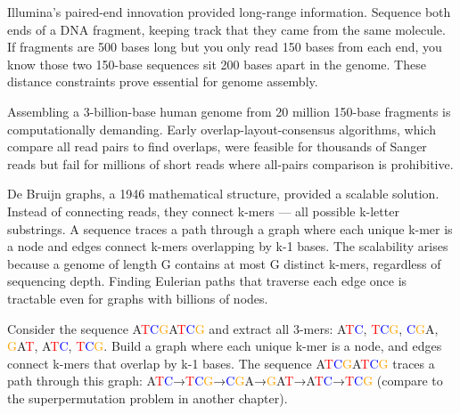 Illumina's paired-end innovation provided long-range information. Sequence both ends of a DNA fragment, keeping track that they came from the same molecule. If fragments are 500 bases long but you only read 150 bases from each end, you know those two 150-base sequences sit 200 bases apart in the genome. These distance constraints prove essential for genome assembly.

Assembling a 3-billion-base human genome from 20 million 150-base fragments is computationally demanding. Early overlap-layout-consensus algorithms, which compare all read pairs to find overlaps, were feasible for thousands of Sanger reads but fail for millions of short reads where all-pairs comparison is prohibitive.

De Bruijn graphs, a 1946 mathematical structure, provided a scalable solution. Instead of connecting reads, they connect k-mers — all possible k-letter substrings. A sequence traces a path through a graph where each unique k-mer is a node and edges connect k-mers overlapping by k-1 bases. The scalability arises because a genome of length G contains at most G distinct k-mers, regardless of sequencing depth. Finding Eulerian paths that traverse each edge once is tractable even for graphs with billions of nodes.

Consider the sequence \textcolor{green!60!black}{A}\textcolor{red}{T}\textcolor{blue}{C}\textcolor{orange}{G}\textcolor{green!60!black}{A}\textcolor{red}{T}\textcolor{blue}{C}\textcolor{orange}{G} and extract all 3-mers: \textcolor{green!60!black}{A}\textcolor{red}{T}\textcolor{blue}{C}, \textcolor{red}{T}\textcolor{blue}{C}\textcolor{orange}{G}, \textcolor{blue}{C}\textcolor{orange}{G}\textcolor{green!60!black}{A}, \textcolor{orange}{G}\textcolor{green!60!black}{A}\textcolor{red}{T}, \textcolor{green!60!black}{A}\textcolor{red}{T}\textcolor{blue}{C}, \textcolor{red}{T}\textcolor{blue}{C}\textcolor{orange}{G}. Build a graph where each unique k-mer is a node, and edges connect k-mers that overlap by k-1 bases. The sequence \textcolor{green!60!black}{A}\textcolor{red}{T}\textcolor{blue}{C}\textcolor{orange}{G}\textcolor{green!60!black}{A}\textcolor{red}{T}\textcolor{blue}{C}\textcolor{orange}{G} traces a path through this graph: \textcolor{green!60!black}{A}\textcolor{red}{T}\textcolor{blue}{C}→\textcolor{red}{T}\textcolor{blue}{C}\textcolor{orange}{G}→\textcolor{blue}{C}\textcolor{orange}{G}\textcolor{green!60!black}{A}→\textcolor{orange}{G}\textcolor{green!60!black}{A}\textcolor{red}{T}→\textcolor{green!60!black}{A}\textcolor{red}{T}\textcolor{blue}{C}→\textcolor{red}{T}\textcolor{blue}{C}\textcolor{orange}{G} (compare to the superpermutation problem in another chapter).

